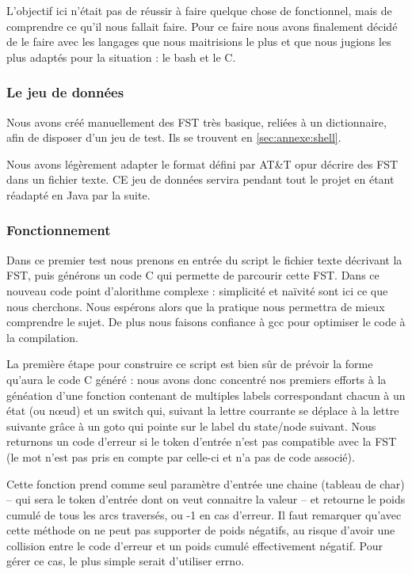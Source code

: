 L'objectif ici n'était pas de réussir à faire quelque chose de fonctionnel, mais de comprendre
ce qu'il nous fallait faire. Pour ce faire nous avons finalement décidé de le faire avec les
langages que nous maitrisions le plus et que nous jugions les plus adaptés pour la situation : le
bash et le C.

\subsubsection{Le jeu de données}

Nous avons créé manuellement des FST très basique, reliées à un dictionnaire, afin de disposer
d'un jeu de test. Ils se trouvent en \autoref{sec:annexe:shell}.

Nous avons légèrement adapter le format défini par AT\&T opur décrire des FST dans un fichier texte.
CE jeu de données servira pendant tout le projet en étant réadapté en Java par la suite.

\subsubsection{Fonctionnement}

Dans ce premier test nous prenons en entrée du script le fichier texte décrivant la FST,
puis générons un code C qui permette de parcourir cette FST.
Dans ce nouveau code point d'alorithme complexe : simplicité et naïvité sont ici ce que nous cherchons.
Nous espérons alors que la pratique nous permettra
de mieux comprendre le sujet.
De plus nous faisons confiance à gcc pour optimiser le code à la compilation.


La première étape pour construire ce script est bien sûr de prévoir la forme qu'aura le code C généré :
nous avons donc concentré nos premiers efforts à la généation d'une fonction contenant de multiples labels
correspondant chacun à un état (ou n\oe ud) et un switch qui, suivant la lettre courrante
se déplace à la lettre suivante grâce à un goto qui pointe sur le label du state/node suivant.
Nous returnons un code d'erreur si le token d'entrée n'est pas compatible avec la FST (le mot n'est pas
pris en compte par celle-ci et n'a pas de code associé).



Cette fonction prend comme seul paramètre d'entrée une chaine (tableau de char) --
qui sera le token d'entrée dont on veut connaitre la valeur -- et retourne le poids cumulé de
tous les arcs traversés, ou -1 en cas d'erreur.
Il faut remarquer qu'avec cette méthode on ne peut pas supporter de poids négatifs,
au risque d'avoir une collision entre le code d'erreur et un poids cumulé effectivement négatif.
Pour gérer ce cas, le plus simple serait d'utiliser errno.


